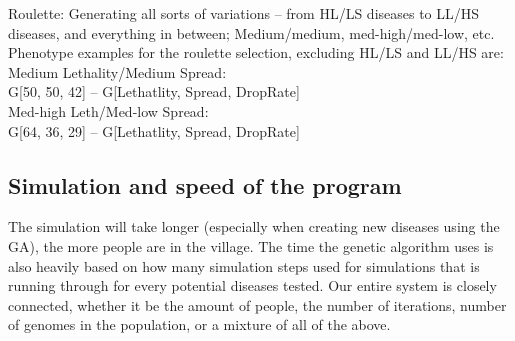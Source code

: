 \documentclass[conference,compsoc]{IEEEtran}
\begin{document}
Roulette: Generating all sorts of variations – from HL/LS diseases to LL/HS diseases, and everything in between; Medium/medium, med-high/med-low, etc.\\
Phenotype examples for the roulette selection, excluding HL/LS and LL/HS are:\\
Medium Lethality/Medium Spread:\\ 
G[50, 50, 42] -- G[Lethatlity, Spread, DropRate]\\
Med-high Leth/Med-low Spread:\\ 
G[64, 36, 29] -- G[Lethatlity, Spread, DropRate]\\


\subsection{Simulation and speed of the program}
The simulation will take longer (especially when creating new diseases using the GA), the more people are in the village. The time the genetic algorithm uses is also heavily based on how many simulation steps used for simulations that is running through for every potential diseases tested. Our entire system is closely connected, whether it be the amount of people, the number of iterations, number of genomes in the population, or a mixture of all of the above.\\
\end{document}

